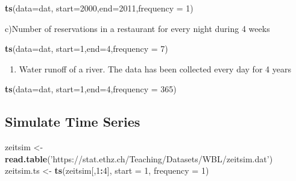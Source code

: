 \documentclass[
]{article}
\newenvironment{Shaded}{\begin{snugshade}}{\end{snugshade}}
\newcommand{\DataTypeTok}[1]{\textcolor[rgb]{0.13,0.29,0.53}{#1}}
\newcommand{\DecValTok}[1]{\textcolor[rgb]{0.00,0.00,0.81}{#1}}
\newcommand{\KeywordTok}[1]{\textcolor[rgb]{0.13,0.29,0.53}{\textbf{#1}}}
\newcommand{\NormalTok}[1]{#1}
\newcommand{\OperatorTok}[1]{\textcolor[rgb]{0.81,0.36,0.00}{\textbf{#1}}}
\newcommand{\StringTok}[1]{\textcolor[rgb]{0.31,0.60,0.02}{#1}}
\providecommand{\tightlist}{%
  \setlength{\itemsep}{0pt}\setlength{\parskip}{0pt}}
\begin{document}
\begin{Shaded}
\begin{Highlighting}[]
\KeywordTok{ts}\NormalTok{(}\DataTypeTok{data=}\NormalTok{dat, }\DataTypeTok{start=}\DecValTok{2000}\NormalTok{,}\DataTypeTok{end=}\DecValTok{2011}\NormalTok{,}\DataTypeTok{frequency =} \DecValTok{1}\NormalTok{)}
\end{Highlighting}
\end{Shaded}

c)Number of reservations in a restaurant for every night during 4 weeks

\begin{Shaded}
\begin{Highlighting}[]
\KeywordTok{ts}\NormalTok{(}\DataTypeTok{data=}\NormalTok{dat, }\DataTypeTok{start=}\DecValTok{1}\NormalTok{,}\DataTypeTok{end=}\DecValTok{4}\NormalTok{,}\DataTypeTok{frequency =} \DecValTok{7}\NormalTok{)}
\end{Highlighting}
\end{Shaded}

\begin{enumerate}
\def\labelenumi{\alph{enumi})}
\setcounter{enumi}{3}
\tightlist
\item
  Water runoff of a river. The data has been collected every day for 4
  years
\end{enumerate}

\begin{Shaded}
\begin{Highlighting}[]
\KeywordTok{ts}\NormalTok{(}\DataTypeTok{data=}\NormalTok{dat, }\DataTypeTok{start=}\DecValTok{1}\NormalTok{,}\DataTypeTok{end=}\DecValTok{4}\NormalTok{,}\DataTypeTok{frequency =} \DecValTok{365}\NormalTok{)}
\end{Highlighting}
\end{Shaded}

\hypertarget{simulate-time-series}{%
\subsection{Simulate Time Series}\label{simulate-time-series}}

\begin{Shaded}
\begin{Highlighting}[]
\NormalTok{zeitsim <-}\StringTok{ }\KeywordTok{read.table}\NormalTok{(}\StringTok{'https://stat.ethz.ch/Teaching/Datasets/WBL/zeitsim.dat'}\NormalTok{)}
\NormalTok{zeitsim.ts <-}\StringTok{ }\KeywordTok{ts}\NormalTok{(zeitsim[,}\DecValTok{1}\OperatorTok{:}\DecValTok{4}\NormalTok{], }\DataTypeTok{start =} \DecValTok{1}\NormalTok{, }\DataTypeTok{frequency =} \DecValTok{1}\NormalTok{)}
\end{Highlighting}
\end{Shaded}
\end{document}
